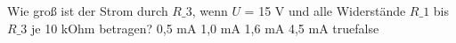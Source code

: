     {Wie groß ist der Strom durch $R\_3$, wenn $U$ = 15 V und alle Widerstände $R\_1$ bis $R\_3$ je 10 kOhm betragen?}
    {0,5 mA}
    {1,0 mA}
    {1,6 mA}
    {4,5 mA}
    {true}{false}